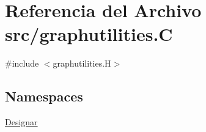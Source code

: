 \hypertarget{graphutilities_8_c}{}\section{Referencia del Archivo src/graphutilities.C}
\label{graphutilities_8_c}
{\ttfamily \#include $<$graphutilities.\+H$>$}\newline
\subsection*{Namespaces}
\begin{DoxyCompactItemize}
\item 
 \hyperlink{namespace_designar}{Designar}
\end{DoxyCompactItemize}
